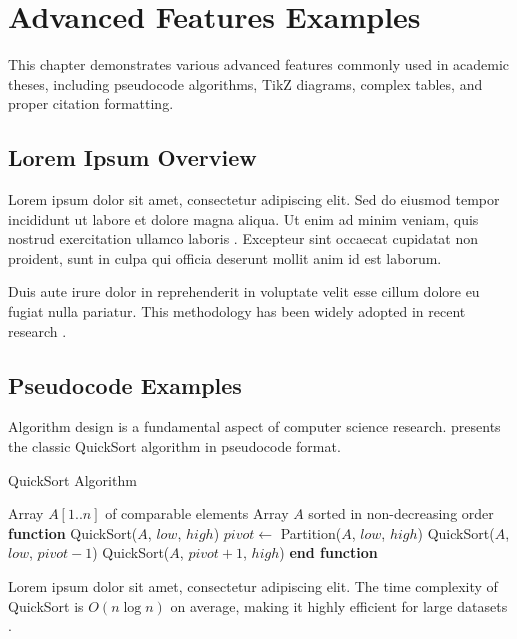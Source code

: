 \chapter{Advanced Features Examples}
\label{chap:examples}

This chapter demonstrates various advanced features commonly used in academic theses, including pseudocode algorithms, TikZ diagrams, complex tables, and proper citation formatting.

\section{Lorem Ipsum Overview}

Lorem ipsum dolor sit amet, consectetur adipiscing elit. Sed do eiusmod tempor incididunt ut labore et dolore magna aliqua. Ut enim ad minim veniam, quis nostrud exercitation ullamco laboris \citep{knuth1984texbook}. Excepteur sint occaecat cupidatat non proident, sunt in culpa qui officia deserunt mollit anim id est laborum.

Duis aute irure dolor in reprehenderit in voluptate velit esse cillum dolore eu fugiat nulla pariatur. This methodology has been widely adopted in recent research \cite{lamport1986latex}.

\section{Pseudocode Examples}

Algorithm design is a fundamental aspect of computer science research.  presents the classic QuickSort algorithm in pseudocode format.

\begin{algorithm}
\caption{QuickSort Algorithm}
\label{alg:quicksort}
\begin{algorithmic}[1]
\REQUIRE Array $A[1..n]$ of comparable elements
\ENSURE Array $A$ sorted in non-decreasing order
\STATE \textbf{function} QuickSort($A$, $low$, $high$)
    \STATE $pivot \leftarrow$ Partition($A$, $low$, $high$)
    \STATE QuickSort($A$, $low$, $pivot - 1$)
    \STATE QuickSort($A$, $pivot + 1$, $high$)
\ENDIF
\STATE \textbf{end function}
\end{algorithmic}
\end{algorithm}

Lorem ipsum dolor sit amet, consectetur adipiscing elit. The time complexity of QuickSort is $O(n \log n)$ on average, making it highly efficient for large datasets \citep{cormen2009introduction}.

